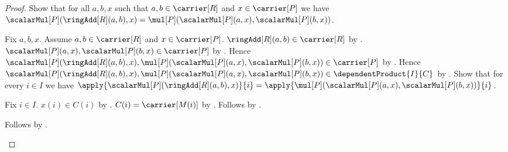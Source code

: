 \begin{proof}
    Show that for all $a,b,x$ such that $a,b\in\carrier[R]$ and
        $x\in\carrier[P]$ we have
        $\scalarMul[P](\ringAdd[R](a,b),x)
            =\mul[P](\scalarMul[P](a,x),\scalarMul[P](b,x))$.
    \begin{subproof}
        Fix $a,b,x$.
        Assume $a,b\in\carrier[R]$ and $x\in\carrier[P]$.
        $\ringAdd[R](a,b)\in\carrier[R]$ by .
        $\scalarMul[P](a,x),\scalarMul[P](b,x)\in\carrier[P]$ by
            .
        Hence
            $\scalarMul[P](\ringAdd[R](a,b),x),
                \mul[P](\scalarMul[P](a,x),\scalarMul[P](b,x))
            \in\carrier[P]$ by
            .
        Hence
            $\scalarMul[P](\ringAdd[R](a,b),x),
                \mul[P](\scalarMul[P](a,x),\scalarMul[P](b,x))
            \in\dependentProduct{I}{C}$ by \auto.
        Show that for every $i\in I$ we have
            $\apply{\scalarMul[P](\ringAdd[R](a,b),x)}{i}
                =\apply{\mul[P]
                    (\scalarMul[P](a,x),\scalarMul[P](b,x))}{i}$.
        \begin{subproof}
            Fix $i\in I$.
            $x(i)\in C(i)$ by .
            $C(i)=\carrier[M(i)]$ by
                .
            Follows by
                .
        \end{subproof}
        Follows by .
    \end{subproof}


\end{proof}

